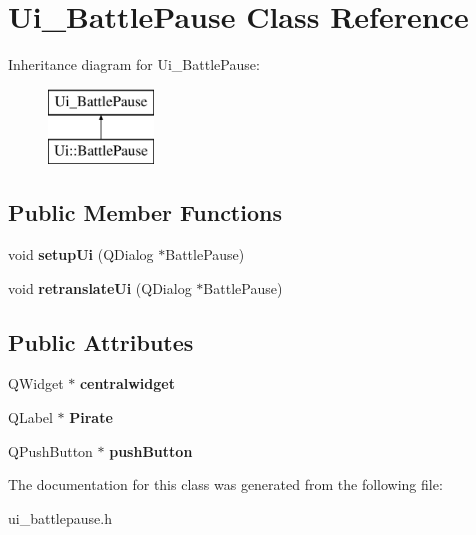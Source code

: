 \hypertarget{class_ui___battle_pause}{\section{Ui\-\_\-\-Battle\-Pause Class Reference}
\label{class_ui___battle_pause}
}
Inheritance diagram for Ui\-\_\-\-Battle\-Pause\-:\begin{figure}[H]
\begin{center}
\leavevmode
\includegraphics[height=2.000000cm]{class_ui___battle_pause}
\end{center}
\end{figure}
\subsection*{Public Member Functions}
\begin{DoxyCompactItemize}
\item 
\hypertarget{class_ui___battle_pause_a6d027885b86492cf6f99da870adb1e68}{void {\bfseries setup\-Ui} (Q\-Dialog $\ast$Battle\-Pause)}\label{class_ui___battle_pause_a6d027885b86492cf6f99da870adb1e68}

\item 
\hypertarget{class_ui___battle_pause_aea959080eab63120c832d9e0ff8309e1}{void {\bfseries retranslate\-Ui} (Q\-Dialog $\ast$Battle\-Pause)}\label{class_ui___battle_pause_aea959080eab63120c832d9e0ff8309e1}

\end{DoxyCompactItemize}
\subsection*{Public Attributes}
\begin{DoxyCompactItemize}
\item 
\hypertarget{class_ui___battle_pause_ad8006d9ba02a53c9c9003883f0e16a66}{Q\-Widget $\ast$ {\bfseries centralwidget}}\label{class_ui___battle_pause_ad8006d9ba02a53c9c9003883f0e16a66}

\item 
\hypertarget{class_ui___battle_pause_aaf264b9928c15ee8ac428eeb03593b74}{Q\-Label $\ast$ {\bfseries Pirate}}\label{class_ui___battle_pause_aaf264b9928c15ee8ac428eeb03593b74}

\item 
\hypertarget{class_ui___battle_pause_ac52cbf9d30b48c456c7d8016b3f2d5c9}{Q\-Push\-Button $\ast$ {\bfseries push\-Button}}\label{class_ui___battle_pause_ac52cbf9d30b48c456c7d8016b3f2d5c9}

\end{DoxyCompactItemize}


The documentation for this class was generated from the following file\-:\begin{DoxyCompactItemize}
\item 
ui\-\_\-battlepause.\-h\end{DoxyCompactItemize}
